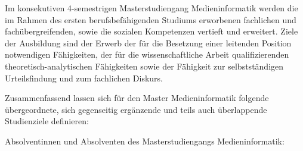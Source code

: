 Im konsekutiven 4-semestrigen Masterstudiengang Medieninformatik werden
die im Rahmen des ersten berufsbefähigenden Studiums erworbenen
fachlichen und fachübergreifenden, sowie die sozialen Kompetenzen
vertieft und erweitert. Ziele der Ausbildung sind der Erwerb der für die
Besetzung einer leitenden Position notwendigen Fähigkeiten, der für die
wissenschaftliche Arbeit qualifizierenden theoretisch-analytischen
Fähigkeiten sowie der Fähigkeit zur selbstständigen Urteilsfindung und
zum fachlichen Diskurs.

Zusammenfassend lassen sich für den Master Medieninformatik folgende
übergeordnete, sich gegenseitig ergänzende und teils auch überlappende
Studienziele definieren:

Absolventinnen und Absolventen des Masterstudiengangs Medieninformatik:

